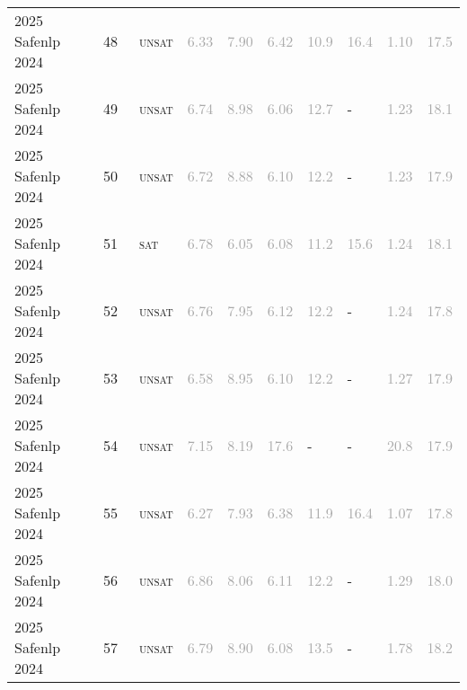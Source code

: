 \begin{center}
{\begin{longtable}{@{}llllllllll@{}}
2025 Safenlp 2024 & 48 & ~\textsc{unsat} & \textcolor{darkgray}{6.33} & \textcolor{darkgray}{7.90} & \textcolor{darkgray}{6.42} & \textcolor{darkgray}{10.9} & \textcolor{darkgray}{16.4} & \textcolor{darkgray}{1.10} & \textcolor{darkgray}{17.5} \\
2025 Safenlp 2024 & 49 & ~\textsc{unsat} & \textcolor{darkgray}{6.74} & \textcolor{darkgray}{8.98} & \textcolor{darkgray}{6.06} & \textcolor{darkgray}{12.7} & - & \textcolor{darkgray}{1.23} & \textcolor{darkgray}{18.1} \\
2025 Safenlp 2024 & 50 & ~\textsc{unsat} & \textcolor{darkgray}{6.72} & \textcolor{darkgray}{8.88} & \textcolor{darkgray}{6.10} & \textcolor{darkgray}{12.2} & - & \textcolor{darkgray}{1.23} & \textcolor{darkgray}{17.9} \\
2025 Safenlp 2024 & 51 & ~\textsc{sat} & \textcolor{darkgray}{6.78} & \textcolor{darkgray}{6.05} & \textcolor{darkgray}{6.08} & \textcolor{darkgray}{11.2} & \textcolor{darkgray}{15.6} & \textcolor{darkgray}{1.24} & \textcolor{darkgray}{18.1} \\
2025 Safenlp 2024 & 52 & ~\textsc{unsat} & \textcolor{darkgray}{6.76} & \textcolor{darkgray}{7.95} & \textcolor{darkgray}{6.12} & \textcolor{darkgray}{12.2} & - & \textcolor{darkgray}{1.24} & \textcolor{darkgray}{17.8} \\
2025 Safenlp 2024 & 53 & ~\textsc{unsat} & \textcolor{darkgray}{6.58} & \textcolor{darkgray}{8.95} & \textcolor{darkgray}{6.10} & \textcolor{darkgray}{12.2} & - & \textcolor{darkgray}{1.27} & \textcolor{darkgray}{17.9} \\
2025 Safenlp 2024 & 54 & ~\textsc{unsat} & \textcolor{darkgray}{7.15} & \textcolor{darkgray}{8.19} & \textcolor{darkgray}{17.6} & - & - & \textcolor{darkgray}{20.8} & \textcolor{darkgray}{17.9} \\
2025 Safenlp 2024 & 55 & ~\textsc{unsat} & \textcolor{darkgray}{6.27} & \textcolor{darkgray}{7.93} & \textcolor{darkgray}{6.38} & \textcolor{darkgray}{11.9} & \textcolor{darkgray}{16.4} & \textcolor{darkgray}{1.07} & \textcolor{darkgray}{17.8} \\
2025 Safenlp 2024 & 56 & ~\textsc{unsat} & \textcolor{darkgray}{6.86} & \textcolor{darkgray}{8.06} & \textcolor{darkgray}{6.11} & \textcolor{darkgray}{12.2} & - & \textcolor{darkgray}{1.29} & \textcolor{darkgray}{18.0} \\
2025 Safenlp 2024 & 57 & ~\textsc{unsat} & \textcolor{darkgray}{6.79} & \textcolor{darkgray}{8.90} & \textcolor{darkgray}{6.08} & \textcolor{darkgray}{13.5} & - & \textcolor{darkgray}{1.78} & \textcolor{darkgray}{18.2} \\

\end{longtable}}
\end{center}
